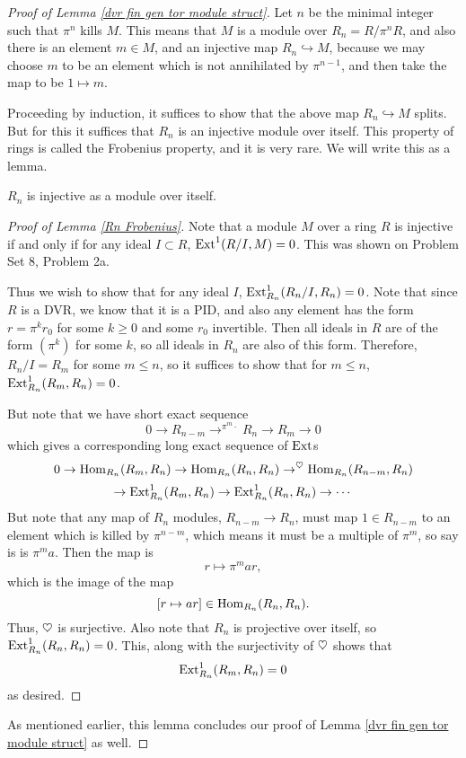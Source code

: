 \begin{proof}[Proof of Lemma \ref{dvr fin gen tor module struct}] Let $n$ be the minimal integer such that $\pi^n$ kills $M$. This means that $M$ is a module over $R_n=R/\pi^nR$, and also there is an element $m \in M$, and an injective map $R_n \hookrightarrow M$, because we may choose $m$ to be an element which is not annihilated by $\pi^{n-1}$, and then take the map to be $1 \mapsto m$.

Proceeding by induction, it suffices to show that the above map $R_n \hookrightarrow M$ splits. But for this it suffices that $R_n$ is an injective module over itself. This property of rings is called the Frobenius property, and it is very rare. We will write this as a lemma.
\begin{lemma} $R_n$ is injective as a module over itself.
\label{Rn Frobenius}
\end{lemma}
\begin{proof}[Proof of Lemma \ref{Rn Frobenius}] Note that a module $M$ over a ring $R$ is injective if and only if for any ideal $I \subset R$, $\operatorname{Ext}^1(R/I,M)=0$. This was shown on  Problem Set 8, Problem 2a.

Thus we wish to show that for any ideal $I$, $\operatorname{Ext}^1_{R_n}(R_n/I,R_n)=0$. Note that since $R$ is a DVR, we know that it is a PID, and also any element has the form $r=\pi^kr_0$ for some $k \geq 0$ and some $r_0$ invertible. Then all ideals in $R$ are of the form $(\pi^k)$ for some $k$, so all ideals in $R_n$ are also of this form. Therefore, $R_n/I=R_m$ for some $m \leq n$, so it suffices to show that for $m \leq n$, $\operatorname{Ext}^1_{R_n}(R_m,R_n)=0$.

But note that we have short exact sequence
\[ 0 \to R_{n-m} \to^{\pi^m \cdot} R_n \to R_m \to 0\]
which gives a corresponding long exact sequence of $\operatorname{Ext}$s
\[0 \to \operatorname{Hom}_{R_n}(R_m,R_n) \to \operatorname{Hom}_{R_n}(R_n,R_n) \to^\heartsuit \operatorname{Hom}_{R_n}(R_{n-m},R_n)\]
\[\to \operatorname{Ext}^1_{R_n}(R_m,R_n) \to \operatorname{Ext}^1_{R_n}(R_n,R_n) \to \cdots\]
But note that any map of $R_n$ modules, $R_{n-m} \to R_n$, must map $1 \in R_{n-m}$ to an element which is killed by $\pi^{n-m}$, which means it must be a multiple of $\pi^m$, so say is is $\pi^ma$. Then the map is
\[r \mapsto \pi^mar,\]
which is the image of the map
\[[r \mapsto ar] \in \operatorname{Hom}_{R_n}(R_n,R_n).\]
Thus, $\heartsuit$ is surjective.
Also note that $R_n$ is projective over itself, so $\operatorname{Ext}^1_{R_n}(R_n,R_n)=0$. This, along with the surjectivity of $\heartsuit$ shows that
\[\operatorname{Ext}^1_{R_n}(R_m,R_n)=0\]
as desired.
\end{proof}
As mentioned earlier, this lemma concludes our proof of Lemma \ref{dvr fin gen tor module struct} as well.
\end{proof}


